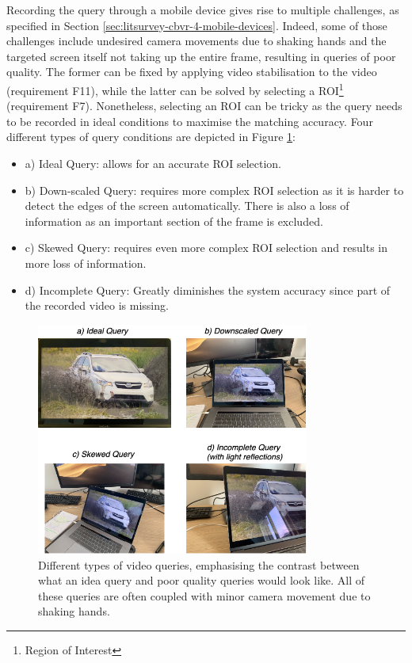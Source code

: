 Recording the query through a mobile device gives rise to multiple challenges, as specified in Section \ref{sec:litsurvey-cbvr-4-mobile-devices}. Indeed, some of those challenges include undesired camera movements due to shaking hands and the targeted screen itself not taking up the entire frame, resulting in queries of poor quality. The former can be fixed by applying video stabilisation to the video (requirement F11), while the latter can be solved by selecting a ROI\footnote{Region of Interest} (requirement F7). Nonetheless, selecting an ROI can be tricky as the query needs to be recorded in ideal conditions to maximise the matching accuracy. Four different types of query conditions are depicted in Figure \ref{fig:difference-query-video-issues}:
\begin{itemize}
    \item a) Ideal Query: allows for an accurate ROI selection.
    \item b) Down-scaled Query: requires more complex ROI selection as it is harder to detect the edges of the screen automatically. There is also a loss of information as an important section of the frame is excluded.
    \item c) Skewed Query: requires even more complex ROI selection and results in more loss of information.
    \item d) Incomplete Query: Greatly diminishes the system accuracy since part of the recorded video is missing.
\end{itemize}

\begin{figure}[h]
\centerline{\includegraphics[width=0.8\textwidth]{figures/design/difference-query-video-issues.png}}
\caption{\label{fig:difference-query-video-issues}Different types of video queries, emphasising the contrast between what an idea query and poor quality queries would look like. All of these queries are often coupled with minor camera movement due to shaking hands.}
\end{figure}

